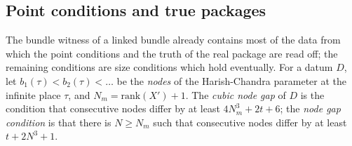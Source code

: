 \subsection{Point conditions and true packages}\label{sec:pf:open0a:points}

The bundle witness of a linked bundle already contains most of the data from which the point conditions and the truth
of the real package are read off; the remaining conditions are size conditions which hold eventually. For a datum $D$,
let $b_1(\tau)<b_2(\tau)<\dots$ be the \emph{nodes} of the Harish-Chandra parameter at the infinite place $\tau$, and
$N_m=\mathrm{rank}(X')+1$. The \emph{cubic node gap} of $D$ is the condition that consecutive nodes differ by at least
$4N_m^3+2t+6$; the \emph{node gap condition} is that there is $N\ge N_m$ such that consecutive nodes differ by at
least $t+2N^3+1$.


